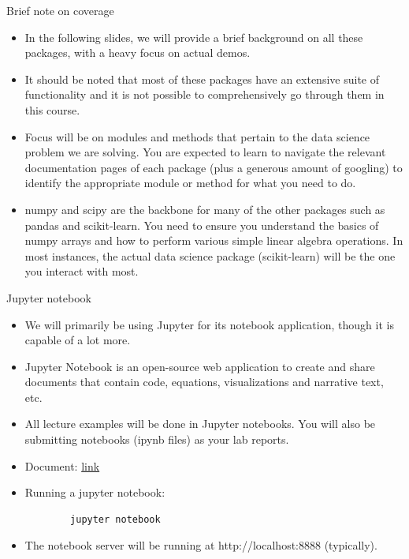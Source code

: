 \documentclass[aspectratio=169]{beamer}
\begin{document}
\begin{frame}{Brief note on coverage}
    \begin{itemize}
        \item In the following slides, we will provide a brief background on all these packages, with a heavy focus on actual demos.
        \item It should be noted that most of these packages have an extensive suite of functionality and it is not possible to comprehensively go through them in this course. 
        \item Focus will be on modules and methods that pertain to the data science problem we are solving. You are expected to learn to navigate the relevant documentation pages of each package (plus a generous amount of googling) to identify the appropriate module or method for what you need to do.
        \item numpy and scipy are the backbone for many of the other packages such as pandas and scikit-learn. You need to ensure you understand the basics of numpy arrays and how to perform various simple linear algebra operations. In most instances, the actual data science package (scikit-learn) will be the one you interact with most.
    \end{itemize}
\end{frame} 


\begin{frame}[fragile]{Jupyter notebook}
    \begin{itemize}
        \item We will primarily be using Jupyter for its notebook application, though it is capable of a lot more.
        \item Jupyter Notebook is an open-source web application to create and share documents that contain code, equations, visualizations and narrative text, etc.
        \item All lecture examples will be done in Jupyter notebooks. You will also be submitting notebooks (ipynb files) as your lab reports.
        \item Document: \href{http://jupyter-notebook.readthedocs.io/en/stable/}{link}
        \item Running a jupyter notebook:
        \begin{verbatim}
        jupyter notebook
        \end{verbatim}
        \item The notebook server will be running at http://localhost:8888 (typically).
    \end{itemize}
\end{frame}
\end{document}
